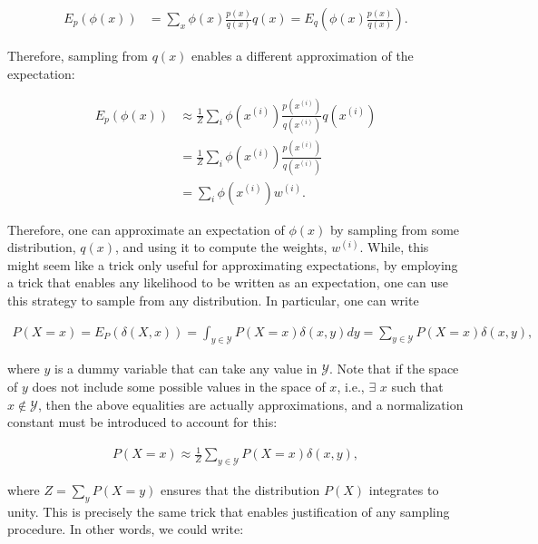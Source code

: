 \documentclass{article}
\begin{document}
\begin{align}
E_p(\phi(x)) &= \sum_x \phi(x) \frac{p(x)}{q(x)} q(x) = E_q \left(\phi(x) \frac{p(x)}{q(x)}\right).
\end{align}

\noindent Therefore, sampling from $q(x)$ enables a different approximation of the expectation:

\begin{subequations}
\begin{align}
E_p(\phi(x))  &\approx \frac{1}{Z} \sum_i \phi(x^{(i)}) \frac{p(x^{(i)})}{q(x^{(i)})} q(x^{(i)})
\\ &= \frac{1}{Z} \sum_i \phi(x^{(i)}) \frac{p(x^{(i)})}{q(x^{(i)})}
\\ &= \sum_i \phi(x^{(i)}) w^{(i)}.
\end{align}
\end{subequations}

\noindent Therefore, one can approximate an expectation of $\phi(x)$ by sampling from some distribution, $q(x)$, and using it to compute the weights, $w^{(i)}$.  While, this might seem like a trick only useful for approximating expectations, by employing a trick that enables any likelihood to be written as an expectation, one can use this strategy to sample from any distribution.  In particular, one can write

\begin{align}
P(X=x) = E_P ( \delta(X,x)) = \int_{y \in \mathcal{Y}} P(X=x) \delta(x,y) dy = \sum_{y \in \mathcal{Y}} P(X=x) \delta(x,y),
\end{align}

\noindent where $y$ is a dummy variable that can take any value in $\mathcal{Y}$.  Note that if the space of $y$ does not include some possible values in the space of $x$, i.e., $\exists$ $x$ such that $x \notin \mathcal{Y}$, then the above equalities are actually approximations, and a normalization constant must be introduced to account for this:

\begin{align}
P(X=x) \approx \frac{1}{Z} \sum_{y \in \mathcal{Y}} P(X=x) \delta(x,y),
\end{align}

 \noindent where $Z=\sum_y P(X=y)$ ensures that the distribution $P(X)$ integrates to unity.  This is precisely the same trick that enables justification of any sampling procedure.  In other words, we could write:
\end{document}
